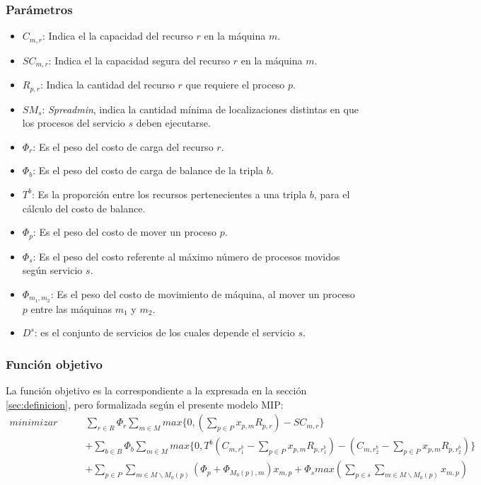 \subsubsection{Parámetros}
\begin{itemize}
	\item $C_{m,r}$: Indica el la capacidad del recurso $r$ en la máquina $m$.
	\item $SC_{m,r}$: Indica el la capacidad segura del recurso $r$ en la máquina $m$.
	\item $R_{p,r}$: Indica la cantidad del recurso $r$ que requiere el proceso $p$.
	\item $SM_{s}$: \textit{Spreadmin}, indica la cantidad mínima de localizaciones distintas en que los procesos del servicio $s$ deben ejecutarse.
	\item $\Phi_{r}$: Es el peso del costo de carga del recurso $r$.
	\item $\Phi_{b}$: Es el peso del costo de carga de balance de la tripla $b$.
	\item $T^b$: Es la proporción entre los recursos pertenecientes a una tripla $b$, para el cálculo del costo de balance.
	\item $\Phi_{p}$: Es el peso del costo de mover un proceso $p$.
	\item $\Phi_{s}$: Es el peso del costo referente al máximo número de procesos movidos según servicio $s$.
	\item $\Phi_{m_1,m_2}$: Es el peso del costo de movimiento de máquina, al mover un proceso $p$ entre las máquinas $m_1$ y $m_2$.
	\item $D^s$: es el conjunto de servicios de los cuales depende el servicio $s$.
\end{itemize}

\subsubsection{Función objetivo}
La función objetivo es la correspondiente a la expresada en la sección \ref{sec:definicion}, pero formalizada según el presente modelo MIP:\\
\begin{align}
	minimizar \qquad& \sum_{r \in R}\Phi_{r}\sum_{m \in M}max \{ 0,(\sum_{p \in P}x_{p,m}R_{p,r}) - SC_{m,r} \} \nonumber \\
					&+ \sum_{b \in B}\Phi_{b}\sum_{m \in M}max\{0, T^b(C_{m,r_{1}^b} - \sum_{p \in P}x_{p,m}R_{p,r_{1}^b}) - (C_{m,r_{2}^b} - \sum_{p \in P}x_{p,m}R_{p,r_{2}^b})\} \nonumber \\
					&+ \sum_{p \in P}\sum_{m \in M \backslash M_0(p)}(\Phi_{p} + \Phi_{M_0(p),m})x_{m,p} + \Phi_{s}max(\sum_{p \in s}\sum_{m \in M \backslash M_0(p)}x_{m,p})
\end{align}

